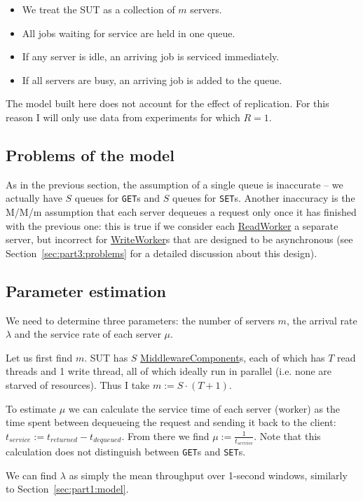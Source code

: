 \documentclass[11pt]{article}
\newcommand{\get}[0]{\texttt{GET}}
\newcommand{\set}[0]{\texttt{SET}}
\newcommand{\linkmain}[1]{\href{https://gitlab.inf.ethz.ch/pungast/asl-fall16-project/blob/master/src/main/java/asl/#1.java}{#1}}
\begin{document}
\begin{itemize}
	\item We treat the SUT as a collection of $m$ servers.
	\item All jobs waiting for service are held in one queue.
	\item If any server is idle, an arriving job is serviced immediately.
	\item If all servers are busy, an arriving job is added to the queue.
\end{itemize}

The model built here does not account for the effect of replication. For this reason I will only use data from experiments for which $R=1$.

\subsection{Problems of the model}
As in the previous section, the assumption of a single queue is inaccurate -- we actually have $S$ queues for \get{}s and $S$ queues for \set{}s. Another inaccuracy is the M/M/m assumption that each server dequeues a request only once it has finished with the previous one: this is true if we consider each \linkmain{ReadWorker} a separate server, but incorrect for \linkmain{WriteWorker}s that are designed to be asynchronous (see Section~\ref{sec:part3:problems} for a detailed discussion about this design).

\subsection{Parameter estimation}

We need to determine three parameters: the number of servers $m$, the arrival rate $\lambda$ and the service rate of each server $\mu$.

Let us first find $m$. SUT has $S$ \linkmain{MiddlewareComponent}s, each of which has $T$ read threads and 1 write thread, all of which ideally run in parallel (i.e. none are starved of resources). Thus I take $m := S \cdot (T + 1)$.

To estimate $\mu$ we can calculate the service time of each server (worker) as the time spent between dequeueing the request and sending it back to the client: $t_{service} := t_{returned} - t_{dequeued}$. From there we find $\mu := \frac{1}{t_{service}}$. Note that this calculation does not distinguish between \get{}s and \set{}s.

We can find $\lambda$ as simply the mean throughput over 1-second windows, similarly to Section~\ref{sec:part1:model}.
\end{document}

